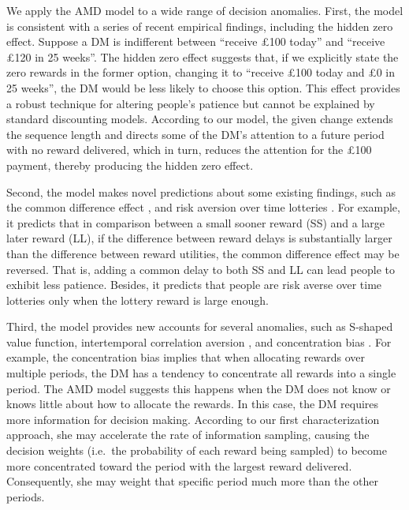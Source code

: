 \documentclass[
  12pt,
]{article}
\begin{document}
We apply the AMD model to a wide range of decision anomalies. First, the
model is consistent with a series of recent empirical findings,
including the hidden zero effect. Suppose a DM is indifferent between
``receive £100 today'' and ``receive £120 in 25 weeks''. The hidden zero
effect suggests that, if we explicitly state the zero rewards in the
former option, changing it to ``receive £100 today and £0 in 25 weeks'',
the DM would be less likely to choose this option. This effect provides
a robust technique for altering people's patience but cannot be
explained by standard discounting models. According to our model, the
given change extends the sequence length and directs some of the DM's
attention to a future period with no reward delivered, which in turn,
reduces the attention for the £100 payment, thereby producing the hidden
zero effect.

Second, the model makes novel predictions about some existing findings,
such as the common difference effect \citep{loewenstein1992anomalies},
and risk aversion over time lotteries
\citep{onay2007intertemporal, dejarnette2020time}. For example, it
predicts that in comparison between a small sooner reward (SS) and a
large later reward (LL), if the difference between reward delays is
substantially larger than the difference between reward utilities, the
common difference effect may be reversed. That is, adding a common delay
to both SS and LL can lead people to exhibit less patience. Besides, it
predicts that people are risk averse over time lotteries only when the
lottery reward is large enough.

Third, the model provides new accounts for several anomalies, such as
S-shaped value function, intertemporal correlation aversion
\citep{andersen2018multiattribute, rohde2023intertemporal}, and
concentration bias \citep{dertwinkel2022concentration}. For example, the
concentration bias implies that when allocating rewards over multiple
periods, the DM has a tendency to concentrate all rewards into a single
period. The AMD model suggests this happens when the DM does not know or
knows little about how to allocate the rewards. In this case, the DM
requires more information for decision making. According to our first
characterization approach, she may accelerate the rate of information
sampling, causing the decision weights (i.e.~the probability of each
reward being sampled) to become more concentrated toward the period with
the largest reward delivered. Consequently, she may weight that specific
period much more than the other periods.
\end{document}

